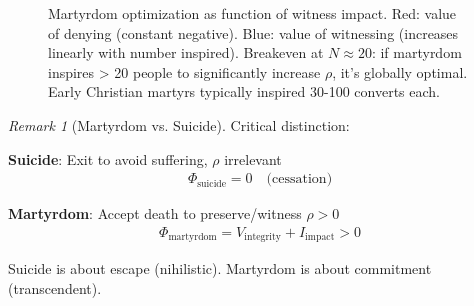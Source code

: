 \documentclass[11pt,a4paper]{article}
\theoremstyle{definition}
\theoremstyle{remark}
\newtheorem{remark}{Remark}[section]
\begin{document}
\begin{enumerate}
\begin{figure}[H]
\caption{Martyrdom optimization as function of witness impact. Red: value of denying (constant negative). Blue: value of witnessing (increases linearly with number inspired). Breakeven at \(N \approx 20\): if martyrdom inspires > 20 people to significantly increase \(\rho\), it's globally optimal. Early Christian martyrs typically inspired 30-100 converts each.}
\label{fig:martyrdom_optimization}
\end{figure}

\begin{remark}[Martyrdom vs. Suicide]
Critical distinction:

\textbf{Suicide}: Exit to avoid suffering, \(\rho\) irrelevant
\begin{align}
\Phi_{\text{suicide}} = 0 \quad \text{(cessation)}
\end{align}

\textbf{Martyrdom}: Accept death to preserve/witness \(\rho > 0\)
\begin{align}
\Phi_{\text{martyrdom}} = V_{\text{integrity}} + I_{\text{impact}} > 0
\end{align}

Suicide is about escape (nihilistic). Martyrdom is about commitment (transcendent).


\end{remark}
\end{enumerate}
\end{document}

